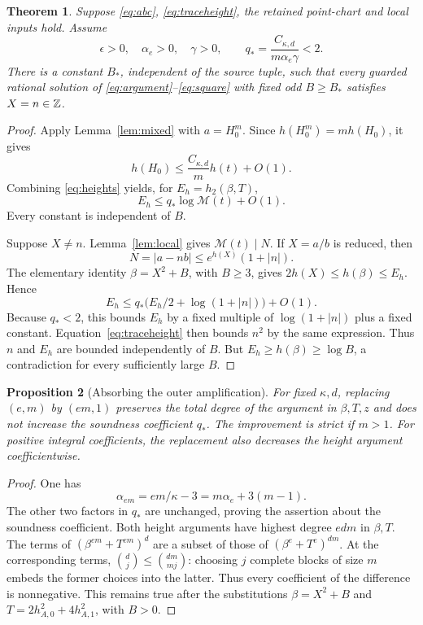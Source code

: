 \documentclass[11pt,a4paper]{article}
\newtheorem{theorem}{Theorem}[section]
\newtheorem{proposition}[theorem]{Proposition}
\begin{document}
\begin{theorem}\label{thm:sound}
Suppose \eqref{eq:abc}, \eqref{eq:traceheight}, the retained point-chart
and local inputs hold. Assume
\[
 \epsilon>0,\quad \alpha_e>0,\quad \gamma>0,\qquad
 q_*=\frac{C_{\kappa,d}}{m\alpha_e\gamma}<2.
\]
There is a constant \(B_*\), independent of the source tuple, such that
every guarded rational solution of \eqref{eq:argument}--\eqref{eq:square}
with fixed odd \(B\ge B_*\) satisfies \(X=n\in\mathbb Z\).
\end{theorem}
\begin{proof}
Apply Lemma~\ref{lem:mixed} with \(a=H_0^m\).
Since \(h(H_0^m)=m h(H_0)\), it gives
\[
 h(H_0)\le\frac{C_{\kappa,d}}m h(t)+O(1).
\]
Combining \eqref{eq:heights} yields, for
\(E_h=h_2(\beta,T)\),
\[
 E_h\le q_*\log\mathcal M(t)+O(1).
\]
Every constant is independent of \(B\).

Suppose \(X\ne n\). Lemma~\ref{lem:local} gives
\(\mathcal M(t)\mid N\). If \(X=a/b\) is reduced, then
\[
 N=|a-nb|\le e^{h(X)}(1+|n|).
\]
The elementary identity \(\beta=X^2+B\), with \(B\ge3\), gives
\(2h(X)\le h(\beta)\le E_h\). Hence
\[
 E_h\le q_*\bigl(E_h/2+\log(1+|n|)\bigr)+O(1).
\]
Because \(q_*<2\), this bounds \(E_h\) by a fixed multiple of
\(\log(1+|n|)\) plus a fixed constant. Equation~\eqref{eq:traceheight}
then bounds \(n^2\) by the same expression. Thus \(n\) and \(E_h\)
are bounded independently of \(B\). But
\(E_h\ge h(\beta)\ge\log B\), a contradiction for every sufficiently
large \(B\).
\end{proof}

\begin{proposition}[Absorbing the outer amplification]\label{prop:amplification}
For fixed \(\kappa,d\), replacing \((e,m)\) by \((em,1)\)
preserves the total degree of the argument in \(\beta,T,z\)
and does not increase the soundness coefficient \(q_*\).
The improvement is strict if \(m>1\). For positive integral coefficients,
the replacement also decreases the height argument coefficientwise.
\end{proposition}
\begin{proof}
One has
\[
 \alpha_{em}=em/\kappa-3=m\alpha_e+3(m-1).
\]
The other two factors in \(q_*\) are unchanged, proving the
assertion about the soundness coefficient. Both height arguments have
highest degree \(edm\) in \(\beta,T\).
The terms of \((\beta^{em}+T^{em})^d\) are a subset of those of
\((\beta^e+T^e)^{dm}\). At the corresponding terms,
\(\binom d j\le\binom{dm}{mj}\): choosing \(j\) complete blocks of size
\(m\) embeds the former choices into the latter. Thus every coefficient
of the difference is nonnegative. This remains true after the
substitutions \(\beta=X^2+B\) and
\(T=2h_{A,0}^2+4h_{A,1}^2\), with \(B>0\).
\end{proof}
\end{document}
